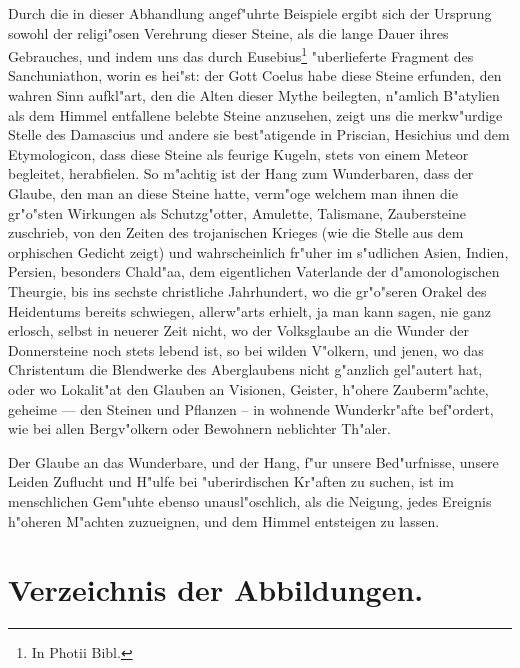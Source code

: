 \documentclass[a4paper, 11pt, oneside, polutonikogreek, german]{article}
\begin{document}
Durch die in dieser Abhandlung angef"uhrte Beispiele ergibt sich der Ursprung sowohl der religi"osen Verehrung dieser Steine, als die lange Dauer ihres Gebrauches, und indem uns das durch Eusebius\footnote{In Photii Bibl.} "uberlieferte Fragment des Sanchuniathon, worin es hei"st: der Gott Coelus habe diese Steine erfunden, den wahren Sinn aufkl"art, den die Alten dieser Mythe beilegten, n"amlich B"atylien als dem Himmel entfallene belebte Steine anzusehen, zeigt uns die merkw"urdige Stelle des Damascius und andere sie best"atigende in Priscian, Hesichius und dem Etymologicon, dass diese Steine als feurige Kugeln, stets von einem Meteor begleitet, herabfielen. So m"achtig ist der Hang zum Wunderbaren, dass der Glaube, den man an diese Steine hatte, verm"oge welchem man ihnen die gr"o"sten Wirkungen als Schutzg"otter, Amulette, Talismane, Zaubersteine zuschrieb, von den Zeiten des trojanischen Krieges (wie die Stelle aus dem orphischen Gedicht zeigt) und wahrscheinlich fr"uher im s"udlichen Asien, Indien, Persien, besonders Chald"aa, dem eigentlichen Vaterlande der d"amonologischen Theurgie, bis ins sechste christliche Jahrhundert, wo die gr"o"seren Orakel des Heidentums bereits schwiegen, allerw"arts erhielt, ja man kann sagen, nie ganz erlosch, selbst in neuerer Zeit nicht, wo der Volksglaube an die Wunder der Donnersteine noch stets lebend ist, so bei wilden V"olkern, und jenen, wo das Christentum die Blendwerke des Aberglaubens nicht g"anzlich gel"autert hat, oder wo Lokalit"at den Glauben an Visionen, Geister, h"ohere Zauberm"achte, geheime --- den Steinen und Pflanzen -- in wohnende Wunderkr"afte bef"ordert, wie bei allen Bergv"olkern oder Bewohnern neblichter Th"aler.

Der Glaube an das Wunderbare, und der Hang, f"ur unsere Bed"urfnisse, unsere Leiden Zuflucht und H"ulfe bei "uberirdischen Kr"aften zu suchen, ist im menschlichen Gem"uhte ebenso unausl"oschlich, als die Neigung, jedes Ereignis h"oheren M"achten zuzueignen, und dem Himmel entsteigen zu lassen.
\clearpage
\section*{Verzeichnis der Abbildungen.}
\end{document}
